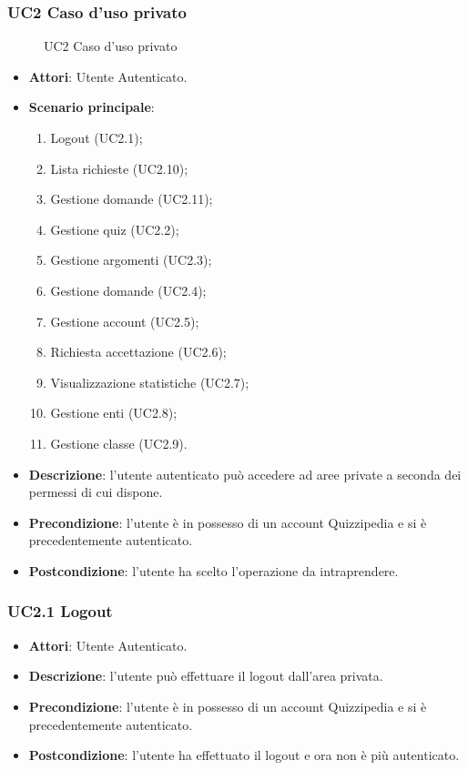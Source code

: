\subsubsection{UC2 Caso d’uso privato}
\begin{figure}[H]
\centering
\noindent{}
\caption{UC2 Caso d’uso privato}
\end{figure}
\begin{itemize}
\item \textbf{Attori}: Utente Autenticato.
\item \textbf{Scenario principale}:
\begin{enumerate}
\item Logout (UC2.1);
\item Lista richieste (UC2.10);
\item Gestione domande (UC2.11);
\item Gestione quiz (UC2.2);
\item Gestione argomenti (UC2.3);
\item Gestione domande (UC2.4);
\item Gestione account (UC2.5);
\item Richiesta accettazione (UC2.6);
\item Visualizzazione statistiche (UC2.7);
\item Gestione enti (UC2.8);
\item Gestione classe (UC2.9).
\end{enumerate}
\item \textbf{Descrizione}: l’utente autenticato può accedere ad aree private a seconda dei permessi di cui dispone.
\item \textbf{Precondizione}: l’utente è in possesso di un account Quizzipedia e si è precedentemente autenticato.
\item \textbf{Postcondizione}: l’utente ha scelto l’operazione da intraprendere.
\end{itemize}
\subsubsection{UC2.1 Logout}
\begin{itemize}
\item \textbf{Attori}: Utente Autenticato.
\item \textbf{Descrizione}: l’utente può effettuare il logout dall’area privata.
\item \textbf{Precondizione}: l’utente è in possesso di un account Quizzipedia e si è precedentemente autenticato.
\item \textbf{Postcondizione}: l’utente ha effettuato il logout e ora non è più autenticato.
\end{itemize}
